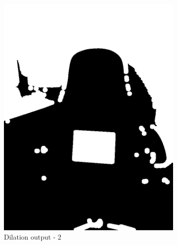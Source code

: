 \documentclass[paper=a4, fontsize=10pt]{scrartcl} %
\numberwithin{equation}{section} %
\numberwithin{figure}{section} %
\begin{document}
\begin{figure}[!ht]
\begin{subfigure}[b]{0.275\textwidth}
		\includegraphics[width=\textwidth]{dilation_02}
		\caption{Dilation output - 2}
		\label{fig:dilation_output_02}
	\end{subfigure}
	~ 
	\begin{subfigure}[b]{0.275\textwidth}

\end{subfigure}
\end{figure}
\end{document}
